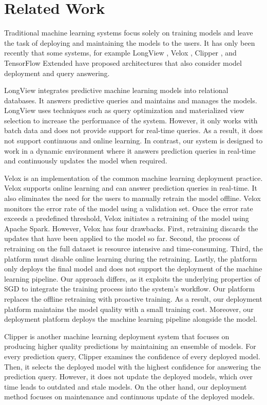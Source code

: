 \section{Related Work} \label{related-work}
Traditional machine learning systems focus solely on training models and leave the task of deploying and maintaining the models to the users.
It has only been recently that some systems, for example LongView \cite{akdere2011case}, Velox \cite{crankshaw2014missing}, Clipper \cite{crankshaw2016clipper} , and TensorFlow Extended \cite{baylor2017tfx} have proposed architectures that also consider model deployment and query answering.

LongView integrates predictive machine learning models into relational databases. 
It answers predictive queries and maintains and manages the models.
LongView uses techniques such as query optimization and materialized view selection to increase the performance of the system.
However, it only works with batch data and does not provide support for real-time queries. 
As a result, it does not support continuous and online learning.
In contrast, our system is designed to work in a dynamic environment where it answers prediction queries in real-time and continuously updates the model when required.

Velox is an implementation of the common machine learning deployment practice.
Velox supports online learning and can answer prediction queries in real-time.
It also eliminates the need for the users to manually retrain the model offline.
Velox monitors the error rate of the model using a validation set.
Once the error rate exceeds a predefined threshold, Velox initiates a retraining of the model using Apache Spark. 
However, Velox has four drawbacks.
First, retraining discards the updates that have been applied to the model so far.
Second, the process of retraining on the full dataset is resource intensive and time-consuming.
Third, the platform must disable online learning during the retraining.
Lastly, the platform only deploys the final model and does not support the deployment of the machine learning pipeline.
Our approach differs, as it exploits the underlying properties of SGD to integrate the training process into the system's workflow.
Our platform replaces the offline retraining with proactive training.
As a result, our deployment platform maintains the model quality with a small training cost.
Moreover, our deployment platform deploys the machine learning pipeline alongside the model.

Clipper is another machine learning deployment system that focuses on producing higher quality predictions by maintaining an ensemble of models.
For every prediction query, Clipper examines the confidence of every deployed model.
Then, it selects the deployed model with the highest confidence for answering the prediction query.
However, it does not update the deployed models, which over time leads to outdated and stale models.
On the other hand, our deployment method focuses on maintenance and continuous update of the deployed models.

